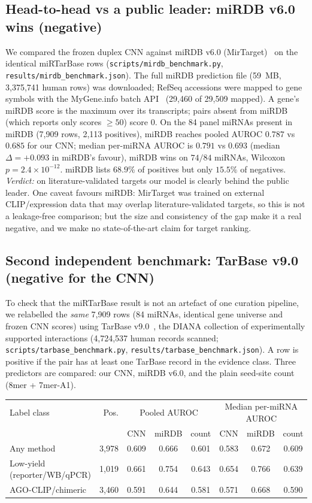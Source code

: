 \documentclass[11pt]{article}
\begin{document}
\subsection{Head-to-head vs a public leader: miRDB v6.0 wins (negative)}
We compared the frozen duplex CNN against miRDB v6.0 (MirTarget)~\cite{mirdb} on the identical miRTarBase rows (\texttt{scripts/mirdb\_benchmark.py}, \texttt{results/mirdb\_benchmark.json}). The full miRDB prediction file (59~MB, 3{,}375{,}741 human rows) was downloaded; RefSeq accessions were mapped to gene symbols with the MyGene.info batch API~\cite{mygene} (29{,}460 of 29{,}509 mapped). A gene's miRDB score is the maximum over its transcripts; pairs absent from miRDB (which reports only scores $\geq 50$) score 0. On the 84 panel miRNAs present in miRDB (7{,}909 rows, 2{,}113 positives), miRDB reaches pooled AUROC $0.787$ vs $0.685$ for our CNN; median per-miRNA AUROC is $0.791$ vs $0.693$ (median $\Delta=+0.093$ in miRDB's favour), miRDB wins on $74/84$ miRNAs, Wilcoxon $p=2.4\times10^{-12}$. miRDB lists $68.9\%$ of positives but only $15.5\%$ of negatives. \emph{Verdict:} on literature-validated targets our model is clearly behind the public leader. One caveat favours miRDB: MirTarget was trained on external CLIP/expression data that may overlap literature-validated targets, so this is not a leakage-free comparison; but the size and consistency of the gap make it a real negative, and we make no state-of-the-art claim for target ranking.

\subsection{Second independent benchmark: TarBase v9.0 (negative for the CNN)}
To check that the miRTarBase result is not an artefact of one curation pipeline, we relabelled the \emph{same} 7{,}909 rows (84 miRNAs, identical gene universe and frozen CNN scores) using TarBase v9.0~\cite{tarbase}, the DIANA collection of experimentally supported interactions (4{,}724{,}537 human records scanned; \texttt{scripts/tarbase\_benchmark.py}, \texttt{results/tarbase\_benchmark.json}). A row is positive if the pair has at least one TarBase record in the evidence class. Three predictors are compared: our CNN, miRDB v6.0, and the plain seed-site count (8mer + 7mer-A1).

\begin{center}\small
\begin{tabular}{lrcccccc}
\hline
Label class & Pos. & \multicolumn{3}{c}{Pooled AUROC} & \multicolumn{3}{c}{Median per-miRNA AUROC}\\
 & & CNN & miRDB & count & CNN & miRDB & count\\
\hline
Any method & 3{,}978 & 0.609 & 0.666 & 0.601 & 0.583 & 0.672 & 0.609\\
Low-yield (reporter/WB/qPCR) & 1{,}019 & 0.661 & 0.754 & 0.643 & 0.654 & 0.766 & 0.639\\
AGO-CLIP/chimeric & 3{,}460 & 0.591 & 0.644 & 0.581 & 0.571 & 0.668 & 0.590\\
\hline
\end{tabular}
\end{center}
\end{document}

